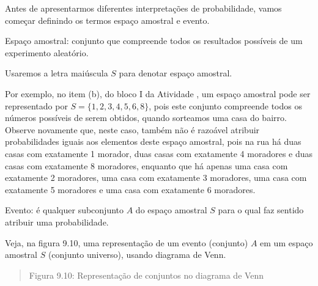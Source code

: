 Antes de apresentarmos diferentes interpretações de probabilidade, vamos começar definindo os termos espaço amostral e evento.
\begin{description}
\item[{Espaço amostral: conjunto que compreende todos os resultados possíveis de um experimento aleatório.}] \leavevmode{}\label{\detokenize{PE511-1:term-espaco-amostral-conjunto-que-compreende-todos-os-resultados-possiveis-de-um-experimento-aleatorio}}
\end{description}

Usaremos a letra maiúscula \(S\) para denotar espaço amostral.

Por exemplo, no item (b), do bloco I da Atividade , um espaço amostral pode ser representado por \(S=\{1,2,3,4,5,6,8\}\), pois este conjunto compreende todos os números possíveis de serem obtidos, quando sorteamos uma casa do bairro. Observe novamente que, neste caso, também não é razoável atribuir probabilidades iguais aos elementos deste espaço amostral, pois na rua há duas casas com exatamente 1 morador, duas casas com exatamente 4 moradores e duas casas com exatamente 8 moradores, enquanto que há apenas uma casa com exatamente 2 moradores, uma casa com  exatamente 3 moradores, uma casa com exatamente 5 moradores e uma casa com exatamente 6 moradores.
\begin{description}
\item[{Evento: é qualquer subconjunto \(A\) do espaço amostral \(S\) para o qual faz sentido atribuir uma probabilidade.}] \leavevmode{}\label{\detokenize{PE511-1:term-evento-e-qualquer-subconjunto-do-espaco-amostral-para-o-qual-faz-sentido-atribuir-uma-probabilidade}}
\end{description}

Veja, na figura 9.10, uma representação de um evento (conjunto) \(A\) em um espaço amostral \(S\) (conjunto universo), usando diagrama de Venn.
\begin{quote}
\begin{center}\end{center}
Figura 9.10: Representação de conjuntos no diagrama de Venn
\end{quote}

